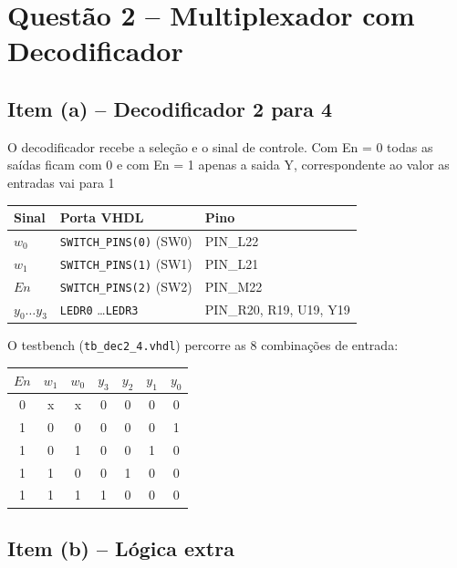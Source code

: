 \documentclass[report, 12pt]{uftreport}
\begin{document}
\chapter{Questão 2 -- Multiplexador com Decodificador}

\section{Item (a) -- Decodificador 2 para 4}

O decodificador recebe a seleção e o sinal de controle. Com En = 0 todas as saídas ficam com 0 e com En = 1 apenas a saida Y, correspondente ao valor as entradas vai para 1

\begin{center}
\begin{tabular}{lll}
\toprule
Sinal & Porta VHDL & Pino \\
\midrule
$w_0$ & \texttt{SWITCH\_PINS(0)} (SW0) & PIN\_L22 \\
$w_1$ & \texttt{SWITCH\_PINS(1)} (SW1) & PIN\_L21 \\
$En$  & \texttt{SWITCH\_PINS(2)} (SW2) & PIN\_M22 \\
$y_0 \ldots y_3$ & \texttt{LEDR0} \ldots \texttt{LEDR3} & PIN\_R20, R19, U19, Y19 \\
\bottomrule
\end{tabular}
\end{center}



O testbench (\texttt{tb\_dec2\_4.vhdl}) percorre as 8 combinações de entrada:

\begin{center}
\begin{tabular}{ccc|cccc}
\toprule
$En$ & $w_1$ & $w_0$ & $y_3$ & $y_2$ & $y_1$ & $y_0$ \\
\midrule
0 & x & x & 0 & 0 & 0 & 0 \\
1 & 0 & 0 & 0 & 0 & 0 & 1 \\
1 & 0 & 1 & 0 & 0 & 1 & 0 \\
1 & 1 & 0 & 0 & 1 & 0 & 0 \\
1 & 1 & 1 & 1 & 0 & 0 & 0 \\
\bottomrule
\end{tabular}
\end{center}

\section{Item (b) -- Lógica extra}
\end{document}
